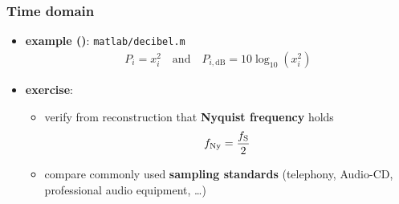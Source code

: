 \begin{frame} %
	\frametitle{Time domain}
	\begin{itemize}
		\item \textbf{example ()}: \texttt{matlab/decibel.m} 
			\begin{align*}
				P_i=x_i^2\quad\textrm{and}\quad P_{i,\textrm{dB}}=10\log_{10}(x_i^2)
			\end{align*}
			\begin{figure}
				\centering
				\begin{subfigure}[c]{0.48\linewidth}
				\end{subfigure}
				\hspace{0.01\linewidth}
				\begin{subfigure}[c]{0.48\linewidth}
				\end{subfigure}
			\end{figure}
		\item \textbf{exercise}:
			\begin{itemize}
				\item verify from reconstruction that \textbf{Nyquist frequency} holds
					\begin{align*}
						f_{\textrm{Ny}}=\frac{f_{\textrm S}}2
					\end{align*}
				\item compare commonly used \textbf{sampling standards} (telephony, Audio-CD, professional audio equipment, \ldots)
			\end{itemize}
	\end{itemize}
\end{frame}

